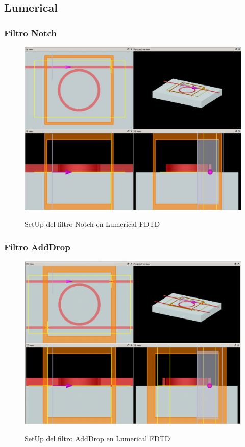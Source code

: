 \subsection{Lumerical}
\label{ss:lumerical}

\subsubsection{Filtro Notch}

\begin{figure}[H]
\caption{SetUp del filtro Notch en Lumerical FDTD}
\centering
\includegraphics[width=1.0\textwidth,natwidth=1066,natheight=799]{figs/lum_setup_n.jpg}
\label{fig:lum_setup_n}
\end{figure} 

\subsubsection{Filtro AddDrop}

\begin{figure}[H]
\caption{SetUp del filtro AddDrop en Lumerical FDTD}
\centering
\includegraphics[width=1.0\textwidth,natwidth=1074,natheight=808]{figs/lum_setup_ad.PNG}
\label{fig:lum_setup_ad}
\end{figure} 

